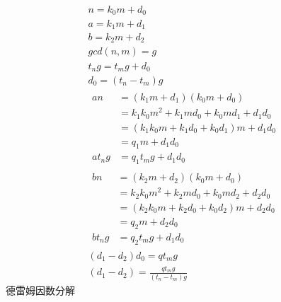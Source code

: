 \documentclass{article}
\begin{document}
\begin{gather*}
  n = k_{0}m + d_{0} \\
  a = k_{1}m + d_{1} \\
  b = k_{2}m + d_{2} \\
  gcd(n, m) = g \\
  t_ng = t_mg + d_{0} \\
  d_0 = (t_n - t_m)g \\
  \begin{aligned}
    an &= (k_{1}m + d_{1})(k_{0}m + d_{0}) \\
      &= k_{1}k_{0}m^{2} + k_{1}md_{0} + k_{0}md_{1} + d_{1}d_{0} \\
      &= (k_{1}k_{0}m + k_{1}d_{0} + k_{0}d_{1})m + d_{1}d_{0} \\
      &= q_{1}m + d_{1}d_{0} \\
    at_{n}g &= q_{1}t_{m}g + d_{1}d_{0}
  \end{aligned} \\
  \begin{aligned}
    bn &= (k_{2}m + d_{2})(k_{0}m + d_{0}) \\
      &= k_{2}k_{0}m^{2} + k_{2}md_{0} + k_{0}md_{2} + d_{2}d_{0} \\
      &= (k_{2}k_{0}m + k_{2}d_{0} + k_{0}d_{2})m + d_{2}d_{0} \\
      &= q_{2}m + d_{2}d_{0} \\
    bt_{n}g &= q_{2}t_{m}g + d_{1}d_{0}
  \end{aligned} \\
  (d_1 - d_2)d_0 = qt_mg \\
  (d_1 - d_2) = \frac{qt_mg}{(t_n - t_m)g}
\end{gather*}
德雷姆因数分解
\end{document}
